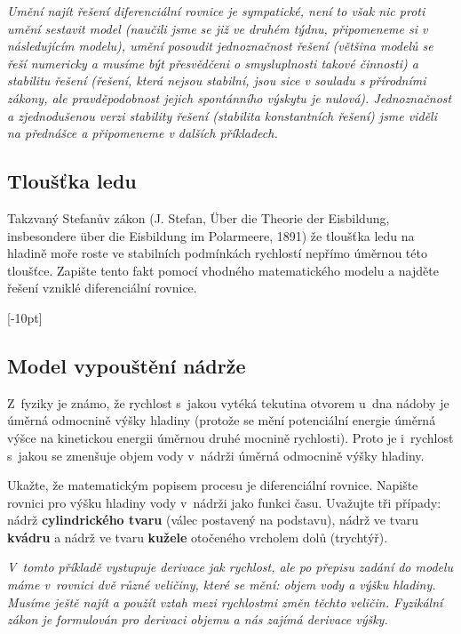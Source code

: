\textit{Umění najít řešení diferenciální rovnice je sympatické, není to však nic proti umění sestavit model (naučili jsme se již ve druhém týdnu, připomeneme si v následujícím modelu), umění posoudit jednoznačnost řešení (většina modelů se řeší numericky a musíme být přesvědčeni o smysluplnosti takové činnosti) a  stabilitu řešení (řešení, která nejsou stabilní, jsou sice v souladu s přírodními zákony, ale pravděpodobnost jejich spontánního výskytu je nulová). Jednoznačnost a zjednodušenou verzi stability řešení (stabilita konstantních řešení) jsme viděli na přednášce a připomeneme v dalších příkladech.}

\stranka

\subsection{Tloušťka ledu}

Takzvaný Stefanův zákon (J. Stefan, \"Uber die Theorie der Eisbildung, insbesondere \"uber die Eisbildung im Polarmeere, 1891) že tloušťka ledu na hladině moře roste ve
stabilních podmínkách rychlostí nepřímo úměrnou této tloušťce. Zapište
tento fakt pomocí vhodného matematického modelu a najděte řešení
vzniklé diferenciální rovnice.



\stranka

[-10pt]
\subsection{Model vypouštění nádrže} \label{vypousteni} Z fyziky je známo, že rychlost s jakou
vytéká tekutina otvorem u dna nádoby je úměrná odmocnině výšky hladiny
(protože se mění potenciální energie úměrná výšce na kinetickou
energii úměrnou druhé mocnině rychlosti). Proto je i rychlost s jakou
se zmenšuje objem vody v nádrži úměrná odmocnině výšky
hladiny.

Ukažte, že matematickým popisem procesu je diferenciální rovnice.
Napište rovnici pro výšku hladiny vody v nádrži jako funkci času.
Uvažujte tři případy:
nádrž \textbf{cylindrického tvaru} (válec postavený na podstavu),
nádrž ve tvaru
\textbf{kvádru} 
a nádrž ve tvaru \textbf{kužele} otočeného vrcholem dolů (trychtýř). 


\textit{V tomto příkladě vystupuje derivace jak rychlost, ale po přepisu zadání do modelu máme v rovnici dvě různé veličiny, které se mění: objem vody a výšku hladiny. Musíme ještě najít a použít vztah mezi rychlostmi změn těchto veličin. Fyzikální zákon je formulován pro derivaci objemu a nás zajímá derivace výšky.}

